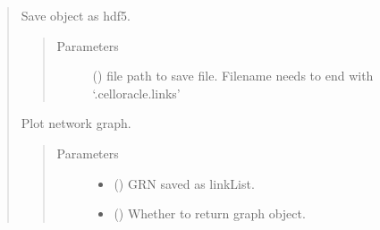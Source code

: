 \documentclass[letterpaper,10pt,english]{sphinxmanual}
\begin{document}
\begin{quote}
\begin{fulllineitems}
\begin{fulllineitems}
\end{fulllineitems}


\begin{fulllineitems}
\label{\detokenize{modules/celloracle.network_analysis:celloracle.network_analysis.Links.to_hdf5}}
Save object as hdf5.
\begin{quote}\begin{description}
\item[{Parameters}] \leavevmode
{} () \textendash{} file path to save file. Filename needs to end with ‘.celloracle.links’

\end{description}\end{quote}

\end{fulllineitems}


\end{fulllineitems}


\begin{fulllineitems}
\label{\detokenize{modules/celloracle.network_analysis:celloracle.network_analysis.draw_network}}
Plot network graph.
\begin{quote}\begin{description}
\item[{Parameters}] \leavevmode\begin{itemize}
\item {} 
 () \textendash{} GRN saved as linkList.

\item {} 
 () \textendash{} Whether to return graph object.


\end{itemize}
\end{description}
\end{quote}
\end{fulllineitems}
\end{quote}
\end{document}
